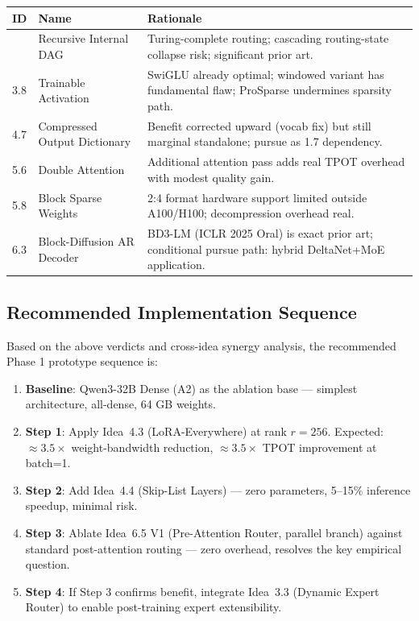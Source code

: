 \documentclass[11pt]{article}
\begin{document}
\begin{longtable}{lp{5cm}p{7cm}}
\toprule
\textbf{ID} & \textbf{Name} & \textbf{Rationale} \\
\midrule
\endhead
\bottomrule
\endfoot
3.6 & Recursive Internal DAG & Turing-complete routing; cascading routing-state collapse risk; significant prior art. \\
3.8 & Trainable Activation & SwiGLU already optimal; windowed variant has fundamental flaw; ProSparse undermines sparsity path. \\
4.7 & Compressed Output Dictionary & Benefit corrected upward (vocab fix) but still marginal standalone; pursue as 1.7 dependency. \\
5.6 & Double Attention & Additional attention pass adds real TPOT overhead with modest quality gain. \\
5.8 & Block Sparse Weights & 2:4 format hardware support limited outside A100/H100; decompression overhead real. \\
6.3 & Block-Diffusion AR Decoder & BD3-LM (ICLR 2025 Oral) is exact prior art; conditional pursue path: hybrid DeltaNet+MoE application. \\
\end{longtable}

\subsection{Recommended Implementation Sequence}

Based on the above verdicts and cross-idea synergy analysis, the recommended Phase 1 prototype sequence is:

\begin{enumerate}
  \item \textbf{Baseline}: Qwen3-32B Dense (A2) as the ablation base --- simplest architecture, all-dense, 64 GB weights.
  \item \textbf{Step 1}: Apply Idea~4.3 (LoRA-Everywhere) at rank $r = 256$. Expected: $\approx 3.5\times$ weight-bandwidth reduction, $\approx 3.5\times$ TPOT improvement at batch=1.
  \item \textbf{Step 2}: Add Idea~4.4 (Skip-List Layers) --- zero parameters, 5--15\% inference speedup, minimal risk.
  \item \textbf{Step 3}: Ablate Idea~6.5 V1 (Pre-Attention Router, parallel branch) against standard post-attention routing --- zero overhead, resolves the key empirical question.
  \item \textbf{Step 4}: If Step 3 confirms benefit, integrate Idea~3.3 (Dynamic Expert Router) to enable post-training expert extensibility.
\end{enumerate}
\end{document}
